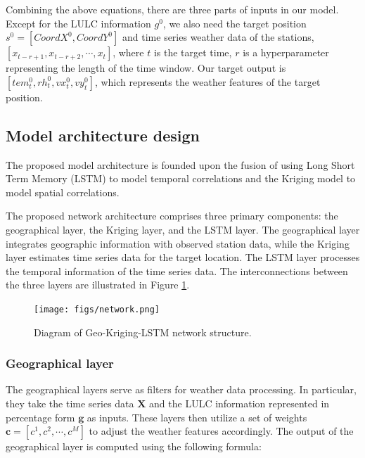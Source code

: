 \documentclass[a4paper,fleqn]{cas-sc}
\begin{document}

Combining the above equations, there are three parts of inputs in our model. Except for the LULC information $g^0$, we also need the target position $s^0=[CoordX^0,CoordY^0]$ and time series weather data of the stations, $[x_{t-r+1},x_{t-r+2},\cdots,x_{t}]$, where $t$ is the target time, $r$ is a hyperparameter representing the length of the time window. Our target output is $[tem^0_t,rh^0_t,vx^0_t,vy^0_t]$, which represents the weather features of the target position.

\subsection{Model architecture design}\label{model_design}

The proposed model architecture is founded upon the fusion of using Long Short Term Memory (LSTM) to model temporal correlations and the Kriging model to model spatial correlations. 

The proposed network architecture comprises three primary components: the geographical layer, the Kriging layer, and the LSTM layer. The geographical layer integrates geographic information with observed station data, while the Kriging layer estimates time series data for the target location. The LSTM layer processes the temporal information of the time series data. The interconnections between the three layers are illustrated in Figure \ref{FIG:network}. 

\begin{figure}[!h]
	\centering
	\texttt{[image: figs/network.png]}
	\caption{Diagram of Geo-Kriging-LSTM network structure.}
	\label{FIG:network}
\end{figure}

\subsubsection{Geographical layer}
The geographical layers serve as filters for weather data processing. In particular, they take the time series data $\mathbf{X}$ and the LULC information represented in percentage form $\mathbf{g}$ as inputs. These layers then utilize a set of weights $\mathbf{c}=[c^1,c^2,\cdots,c^M]$ to adjust the weather features accordingly. The output of the geographical layer is computed using the following formula:
 
\end{document}
